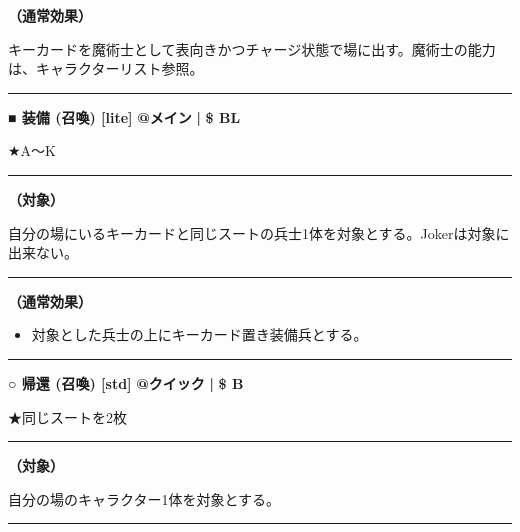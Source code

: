 \documentclass[twocolumn,a5paper,papersize,10pt]{jarticle}
\begin{document}
{\bf（通常効果）}

キーカードを魔術士として表向きかつチャージ状態で場に出す。魔術士の能力は、キャラクターリスト参照。
\vspace{2mm} %
\hrule height 0.5mm depth 0mm width 66.5mm %
\vspace{1mm} %
{\normalsize\bf ■ 装備 {\scriptsize (召喚) [lite]}} %
\hfill 
{\small\bf @メイン }
  {\small\bf | } {\small\bf \$ BL}

★A〜K

\vspace{1mm}%
\hrule height 0.1mm depth 0mm width 66.5mm %
\vspace{1mm}%
{\bf（対象）}

自分の場にいるキーカードと同じスートの兵士1体を対象とする。Jokerは対象に出来ない。
\vspace{1mm}%
\hrule height 0.1mm depth 0mm width 66.5mm %
\vspace{1mm}%

{\bf（通常効果）}


\vspace{-1zh}%
\begin{itemize}
\setlength{\leftskip}{-0.3cm}
\setlength{\parskip}{0pt} %

\item 対象とした兵士の上にキーカード置き装備兵とする。
\vspace{-1zh}%
\end{itemize}
\vspace{2mm} %
\hrule height 0.5mm depth 0mm width 66.5mm %
\vspace{1mm} %
{\normalsize\bf ○ 帰還 {\scriptsize (召喚) [std]}} %
\hfill 
{\small\bf @クイック }
  {\small\bf | } {\small\bf \$ B}

★同じスートを2枚

\vspace{1mm}%
\hrule height 0.1mm depth 0mm width 66.5mm %
\vspace{1mm}%
{\bf（対象）}

自分の場のキャラクター1体を対象とする。
\vspace{1mm}%
\hrule height 0.1mm depth 0mm width 66.5mm %
\vspace{1mm}%
\end{document}
